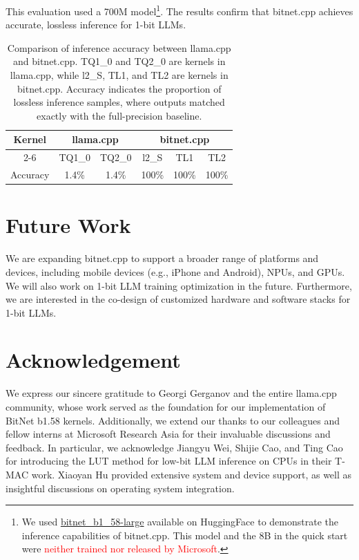 \documentclass{article}
\newcommand\bitnet{\text{BitNet b1.58}}
\begin{document}
This evaluation used a 700M \bitnet{} model\footnote{We used \href{https://huggingface.co/1bitLLM/bitnet_b1_58-large}{bitnet\_b1\_58-large} available on HuggingFace to demonstrate the inference capabilities of bitnet.cpp. This model and the 8B \bitnet{}\cite{mohamed1.58} in the quick start were \textcolor{red}{neither trained nor released by Microsoft}.}.  The results confirm that bitnet.cpp achieves accurate, lossless inference for 1-bit LLMs.
\begin{table}[h]
    \centering \renewcommand{\arraystretch}{1.2}
    \begin{tabular}{c|cc|ccc}
        \toprule
        \multirow{2}{*}{Kernel} &\multicolumn{2}{c|}{llama.cpp} & \multicolumn{3}{c}{bitnet.cpp} \\ \cline{2-6}
         &  TQ1\_0 & TQ2\_0 & l2\_S & TL1 & TL2 \\ \hline
        Accuracy &  1.4\% & 1.4\% & 100\% & 100\% & 100\% \\ 
        \bottomrule
    \end{tabular}
    \vspace{0.2cm}
    \caption{Comparison of inference accuracy between llama.cpp and bitnet.cpp. TQ1\_0 and TQ2\_0 are kernels in llama.cpp, while l2\_S, TL1, and TL2 are kernels in bitnet.cpp. Accuracy indicates the proportion of lossless inference samples, where outputs matched exactly with the full-precision baseline.}

\end{table}


\section{Future Work}
We are expanding bitnet.cpp to support a broader range of platforms and devices, including mobile devices (e.g., iPhone and Android), NPUs, and GPUs. We will also work on 1-bit LLM training optimization in the future. Furthermore, we are interested in the co-design of customized hardware and software stacks for 1-bit LLMs.

\section*{Acknowledgement}
We express our sincere gratitude to Georgi Gerganov and the entire llama.cpp community, whose work served as the foundation for our implementation of BitNet b1.58 kernels. Additionally, we extend our thanks to our colleagues and fellow interns at Microsoft Research Asia for their invaluable discussions and feedback. In particular, we acknowledge Jiangyu Wei, Shijie Cao, and Ting Cao for introducing the LUT method for low-bit LLM inference on CPUs in their T-MAC work. Xiaoyan Hu provided extensive system and device support, as well as insightful discussions on operating system integration.
\end{document}
